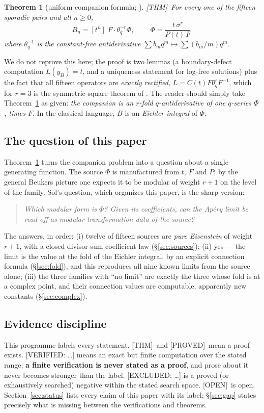 \documentclass[11pt,reqno]{amsart}
\theoremstyle{plain}
\newtheorem{theorem}{Theorem}[section]
\theoremstyle{definition}
\theoremstyle{remark}
\newcommand{\thq}{\theta_q}
\newcommand{\Thm}{\textup{\textsf{[THM]}}}
\newcommand{\Proved}{\textup{\textsf{[PROVED]}}}
\newcommand{\VerifiedR}[1]{\textup{\textsf{[VERIFIED: #1]}}}
\newcommand{\ExcludedR}[1]{\textup{\textsf{[EXCLUDED: #1]}}}
\newcommand{\Open}{\textup{\textsf{[OPEN]}}}
\begin{document}
\begin{theorem}[uniform companion formula; \cite{anchors}]\label{thm:companion}
\Thm\ For every one of the fifteen sporadic pairs and all $n\ge0$,
\[
B_n=[t^n]\;F\cdot\thq^{-r}\Phi,\qquad
\boxed{\ \Phi=\frac{t\,\sigma^{r}}{P(t)\,F}\ }
\]
where $\thq^{-1}$ is the constant-free antiderivative
$\sum b_mq^m\mapsto\sum (b_m/m)q^m$.
\end{theorem}

We do not reprove this here; the proof is two lemmas (a boundary-defect
computation $L(y_B)=t$, and a uniqueness statement for log-free solutions)
plus the fact that all fifteen operators are \emph{exactly rectified},
$L=C(t)F\thq^{r}F^{-1}$, which for $r=3$ is the symmetric-square theorem of
\cite{anchors}. The reader should simply take Theorem~\ref{thm:companion}
as given: \emph{the companion is an $r$-fold $q$-antiderivative of one
$q$-series $\Phi$, times $F$}. In the classical language, $B$ is an
\emph{Eichler integral} of $\Phi$.

\subsection{The question of this paper}
Theorem~\ref{thm:companion} turns the companion problem into a question
about a single generating function. The source $\Phi$ is manufactured from
$t$, $F$ and $P$; by the general Beukers picture one expects it to be
modular of weight $r+1$ on the level of the family. Sol's question, which
organizes this paper, is the sharp version:

\begin{quote}
\emph{Which modular form is $\Phi$? Given its coefficients, can the Ap\'ery
limit be read off as modular-transformation data of the source?}
\end{quote}

The answers, in order: (i) twelve of fifteen sources are \emph{pure
Eisenstein} of weight $r+1$, with a closed divisor-sum coefficient law
(\S\ref{sec:sources}); (ii) yes --- the limit is the value at the fold of
the Eichler integral, by an explicit connection formula
(\S\ref{sec:fold}), and this reproduces all nine known limits from the
source alone; (iii) the three families with ``no limit'' are exactly the
three whose fold is at a complex point, and their connection values are
computable, apparently new constants (\S\ref{sec:complex}).

\subsection{Evidence discipline}
This programme labels every statement. \Thm\ and \Proved\ mean a proof
exists. \VerifiedR{\dots} means an exact but finite computation over the
stated range; \textbf{a finite verification is never stated as a proof},
and prose about it never becomes stronger than the label. \ExcludedR{\dots}
is a proved (or exhaustively searched) negative within the stated search
space. \Open\ is open. Section~\ref{sec:status} lists every claim of this
paper with its label; \S\ref{sec:gap} states precisely what is missing
between the verifications and theorems.
\end{document}
